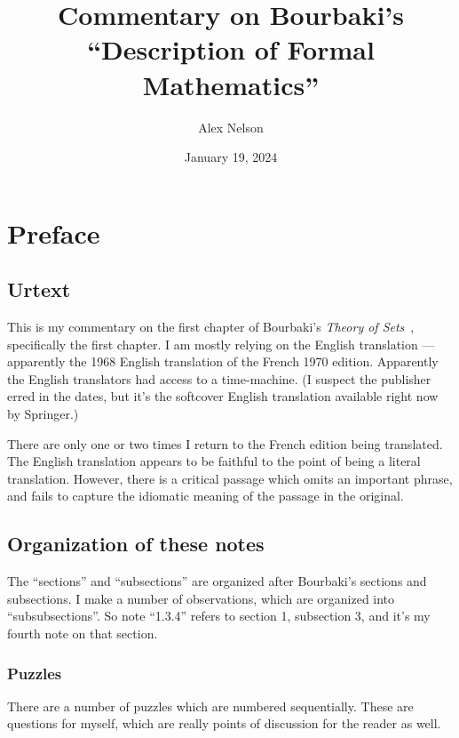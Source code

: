 \documentclass{amsart}
\title{Commentary on Bourbaki's ``Description of Formal Mathematics''}
\author{Alex Nelson}
\date{January 19, 2024}
\begin{document}
\maketitle

\tableofcontents

\vfill\eject
\section{Preface}

\subsection{Urtext}
This is my commentary on the first chapter of Bourbaki's \textit{Theory of Sets}~\cite{bourbaki1970sets},
specifically the first chapter. I am mostly relying on the English
translation --- apparently the 1968 English translation of the French 1970
edition. Apparently the English translators had access to a time-machine.
(I suspect the publisher erred in the dates, but it's the softcover
English translation available right now by Springer.)

There are only one or two times I return to the French edition being
translated. The English translation appears to be faithful to the point
of being a literal translation. However, there is a critical passage
which omits an important phrase, and fails to capture the idiomatic
meaning of the passage in the original.


\subsection{Organization of these notes}
The ``sections'' and ``subsections'' are organized after Bourbaki's
sections and subsections. I make a number of observations, which are
organized into ``subsubsections''. So note ``1.3.4'' refers to section
1, subsection 3, and it's my fourth note on that section.

\subsubsection{Puzzles} There are a number of puzzles which are numbered
sequentially. These are questions for myself, which are really points of
discussion for the reader as well.
\end{document}
